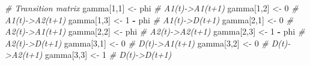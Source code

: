 \documentclass[
  12pt,
]{krantz}
\newenvironment{Shaded}{\begin{snugshade}}{\end{snugshade}}
\newcommand{\CommentTok}[1]{\textcolor[rgb]{0.56,0.35,0.01}{\textit{#1}}}
\newcommand{\DecValTok}[1]{\textcolor[rgb]{0.00,0.00,0.81}{#1}}
\newcommand{\NormalTok}[1]{#1}
\newcommand{\OtherTok}[1]{\textcolor[rgb]{0.56,0.35,0.01}{#1}}
\newcommand{\SpecialCharTok}[1]{\textcolor[rgb]{0.81,0.36,0.00}{\textbf{#1}}}
\begin{document}
\begin{Shaded}
\begin{Highlighting}[]
\CommentTok{\# Transition matrix}
\NormalTok{gamma[}\DecValTok{1}\NormalTok{,}\DecValTok{1}\NormalTok{] }\OtherTok{\textless{}{-}}\NormalTok{ phi      }\CommentTok{\# A1(t){-}\textgreater{}A1(t+1)}
\NormalTok{gamma[}\DecValTok{1}\NormalTok{,}\DecValTok{2}\NormalTok{] }\OtherTok{\textless{}{-}} \DecValTok{0}        \CommentTok{\# A1(t){-}\textgreater{}A2(t+1)}
\NormalTok{gamma[}\DecValTok{1}\NormalTok{,}\DecValTok{3}\NormalTok{] }\OtherTok{\textless{}{-}} \DecValTok{1} \SpecialCharTok{{-}}\NormalTok{ phi  }\CommentTok{\# A1(t){-}\textgreater{}D(t+1)}
\NormalTok{gamma[}\DecValTok{2}\NormalTok{,}\DecValTok{1}\NormalTok{] }\OtherTok{\textless{}{-}} \DecValTok{0}        \CommentTok{\# A2(t){-}\textgreater{}A1(t+1)}
\NormalTok{gamma[}\DecValTok{2}\NormalTok{,}\DecValTok{2}\NormalTok{] }\OtherTok{\textless{}{-}}\NormalTok{ phi      }\CommentTok{\# A2(t){-}\textgreater{}A2(t+1)}
\NormalTok{gamma[}\DecValTok{2}\NormalTok{,}\DecValTok{3}\NormalTok{] }\OtherTok{\textless{}{-}} \DecValTok{1} \SpecialCharTok{{-}}\NormalTok{ phi  }\CommentTok{\# A2(t){-}\textgreater{}D(t+1)}
\NormalTok{gamma[}\DecValTok{3}\NormalTok{,}\DecValTok{1}\NormalTok{] }\OtherTok{\textless{}{-}} \DecValTok{0}        \CommentTok{\# D(t){-}\textgreater{}A1(t+1)}
\NormalTok{gamma[}\DecValTok{3}\NormalTok{,}\DecValTok{2}\NormalTok{] }\OtherTok{\textless{}{-}} \DecValTok{0}        \CommentTok{\# D(t){-}\textgreater{}A2(t+1)}
\NormalTok{gamma[}\DecValTok{3}\NormalTok{,}\DecValTok{3}\NormalTok{] }\OtherTok{\textless{}{-}} \DecValTok{1}        \CommentTok{\# D(t){-}\textgreater{}D(t+1)}
\end{Highlighting}
\end{Shaded}
\end{document}
